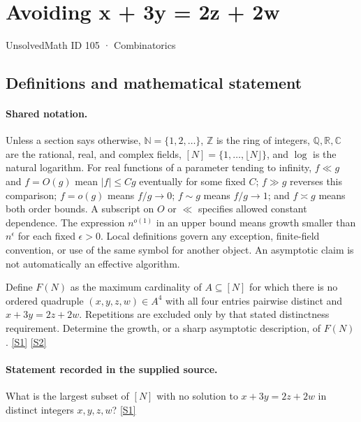 \documentclass[11pt,a4paper]{article}
\newcommand{\N}{\mathbb{N}}
\newcommand{\Z}{\mathbb{Z}}
\newcommand{\Q}{\mathbb{Q}}
\newcommand{\R}{\mathbb{R}}
\newcommand{\C}{\mathbb{C}}
\newcommand{\sref}[2]{\hyperlink{source:#1:#2}{[S#2]}}
\begin{document}

\setcounter{section}{104}

\section{Avoiding x + 3y = 2z + 2w}\label{105}

{\small\sffamily UnsolvedMath ID 105 · Combinatorics}

\subsection{Definitions and mathematical statement}

\paragraph{Shared notation.}Unless a section says otherwise, $\N=\{1,2,\ldots\}$,
$\Z$ is the ring of integers, $\Q,\R,\C$ are the rational, real, and complex
fields, $[N]=\{1,\ldots,\lfloor N\rfloor\}$, and $\log$ is the natural
logarithm. For real functions of a parameter tending to infinity,
$f\ll g$ and $f=O(g)$ mean $|f|\leq Cg$ eventually for some fixed $C$;
$f\gg g$ reverses this comparison; $f=o(g)$ means $f/g\to0$;
$f\sim g$ means $f/g\to1$; and $f\asymp g$ means both order bounds.
A subscript on $O$ or $\ll$ specifies allowed constant dependence.
The expression $n^{o(1)}$ in an upper bound means growth smaller than
$n^\epsilon$ for each fixed $\epsilon>0$. Local definitions govern any
exception, finite-field convention, or use of the same symbol for another
object. An asymptotic claim is not automatically an effective algorithm.



Define $F(N)$ as the maximum cardinality of $A\subseteq[N]$ for which there is no ordered quadruple $(x,y,z,w)\in A^4$ with all four entries pairwise distinct and $x+3y=2z+2w$. Repetitions are excluded only by that stated distinctness requirement. Determine the growth, or a sharp asymptotic description, of $F(N)$. \sref{105}{1} \sref{105}{2}

\paragraph{Statement recorded in the supplied source.}
What is the largest subset of $[N]$ with no solution to $x + 3y = 2z + 2w$ in distinct integers $x, y, z, w$? \sref{105}{1}
\end{document}
